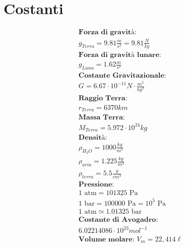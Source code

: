 \section{Costanti}

\begin{gather*}
    \textbf{Forza di gravità: } \\ g_{Terra} = 9.81 \frac{m}{s^2} = 9.81 \frac{N}{kg}\\
    \textbf{Forza di gravità lunare: } \\ g_{Luna} = 1.62 \frac{m}{s^2} \\
    \textbf{Costante Gravitazionale: } \\
    G = 6.67 \cdot 10^{-11} N \cdot \frac{m^2}{kg^2} \\
    \textbf{Raggio Terra: } \\ r_{Terra} = 6370 km \\
    \textbf{Massa Terra: } \\ M_{Terra} = 5.972 \cdot 10^{24} kg \\
    \textbf{Densità: } \\
    \rho_{H_2O} = 1000 \frac{kg}{m^3} \\
    \rho_{aria} = 1.225 \frac{kg}{m^3} \\
    \rho_{terra} = 5.5 \frac{g}{cm^3} \\
    \textbf{Pressione: } \\
    1 \text{ atm} = 101 325 \text{ Pa} \\
    1 \text{ bar} = 100 000 \text{ Pa} = 10^5 \text{ Pa} \\
    1 \text{ atm} \simeq 1.01325 \text{ bar} \\
    \textbf{Costante di Avogadro: } \\
    6.02214086 \cdot 10^{23} mol^{-1} \\
    \textbf{Volume molare: } V_m = 22,414 \ell
\end{gather*}
